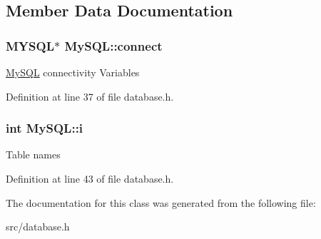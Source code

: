 \subsection{Member Data Documentation}
\hypertarget{classMySQL_a56a2a9159f6d46d8b3bd648e1f08e2b1}{
\subsubsection[{connect}]{\setlength{\rightskip}{0pt plus 5cm}M\-Y\-S\-Q\-L$\ast$ My\-S\-Q\-L\-::connect\hspace{0.3cm}{\ttfamily [protected]}}}\label{classMySQL_a56a2a9159f6d46d8b3bd648e1f08e2b1}
\hyperlink{classMySQL}{My\-S\-Q\-L} connectivity Variables 

Definition at line 37 of file database.\-h.

\hypertarget{classMySQL_ae461697dbdebb43334caa98e80bd5526}{
\subsubsection[{i}]{\setlength{\rightskip}{0pt plus 5cm}int My\-S\-Q\-L\-::i\hspace{0.3cm}{\ttfamily [protected]}}}\label{classMySQL_ae461697dbdebb43334caa98e80bd5526}
Table names 

Definition at line 43 of file database.\-h.



The documentation for this class was generated from the following file\-:\begin{DoxyCompactItemize}
\item 
src/database.\-h\end{DoxyCompactItemize}
